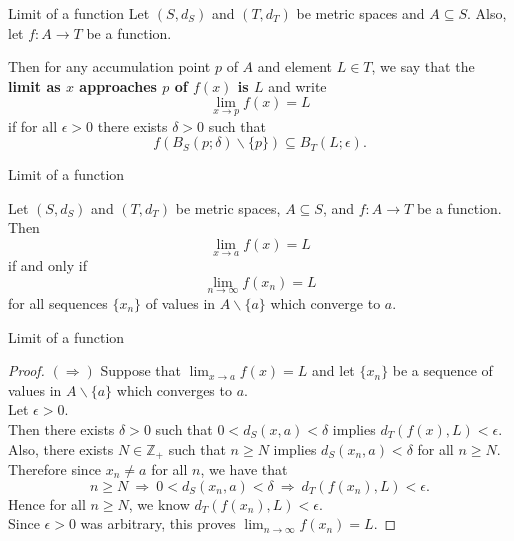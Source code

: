 \documentclass{beamer}
\begin{document}
\begin{frame}{Limit of a function}
Let $(S,d_S)$ and $(T,d_T)$ be metric spaces and $A\subseteq S$.
\pause
Also, let $f: A\rightarrow T$ be a function.
\pause
\begin{defn}
\pause
Then for any accumulation point $p$ of $A$ and element $L\in T$, we say that the \textbf{limit as $x$ approaches $p$ of $f(x)$ is $L$}
\pause
 and write
$$\lim_{x\rightarrow p} f(x) = L$$
\pause
if for all $\epsilon > 0$ there exists $\delta > 0$ such that
$$f(B_S(p;\delta)\backslash\{p\})\subseteq B_T(L;\epsilon).$$
\end{defn}
\end{frame}

\begin{frame}{Limit of a function}
\begin{thm}
\pause
Let $(S,d_S)$ and $(T,d_T)$ be metric spaces, $A\subseteq S$, and $f: A\rightarrow T$ be a function.
\pause
Then
$$\lim_{x\rightarrow a} f(x) = L$$
\pause
if and only if
$$\lim_{n\rightarrow \infty} f(x_n) = L$$
for all sequences $\{x_n\}$ of values in $A\backslash \{a\}$ which converge to $a$.
\end{thm}
\end{frame}

\begin{frame}{Limit of a function}
\begin{proof}
$(\Rightarrow)$\quad
Suppose that $\lim_{x\rightarrow a} f(x) =L$ and let $\{x_n\}$ be a sequence of values in $A\backslash\{a\}$ which converges to $a$.\\
\pause
Let $\epsilon > 0$.\\
\pause
Then there exists $\delta > 0$ such that $0 < d_S(x,a) < \delta$ implies $d_T(f(x),L) < \epsilon$.\\
\pause
Also, there exists $N \in\mathbb{Z}_+$ such that $n\geq N$ implies $d_S(x_n,a) < \delta$ for all $n\geq N$.\\
\pause
Therefore since $x_n\neq a$ for all $n$, we have that
$$n\geq N\ \Rightarrow\ 0 < d_S(x_n,a) < \delta\ \Rightarrow\ d_T(f(x_n), L) < \epsilon.$$
\pause
Hence for all $n\geq N$, we know $d_T(f(x_n), L) < \epsilon$.\\
\pause
Since $\epsilon > 0$ was arbitrary, this proves $\lim_{n\rightarrow \infty} f(x_n) = L$.
\end{proof}
\end{frame}
\end{document}
